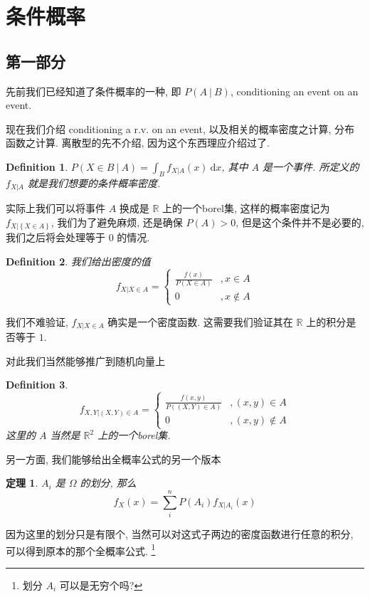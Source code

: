 \documentclass[a4paper, 10pt]{ctexart} %
\newtheorem{theorem}{定理}
\newtheorem{definition}{Definition}
\begin{document}
\section{条件概率}
\subsection{第一部分}
先前我们已经知道了条件概率的一种, 即 $P\left(A\ | \ B\right)$, conditioning an event on an event.

现在我们介绍 conditioning a r.v. on an event, 以及相关的概率密度之计算, 分布函数之计算. 离散型的先不介绍, 因为这个东西理应介绍过了. 
\begin{definition}
    $\displaystyle P\left(X \in B \ | \ A\right) = \int  _{B} f _{X  |  A } \left(x\right) \ \mathrm{d}x$, 其中 $A$ 是一个事件. 所定义的 $f _{X  |  A}$ 就是我们想要的条件概率密度.
\end{definition}
实际上我们可以将事件 $A$ 换成是 $\mathbb{R}$ 上的一个borel集, 这样的概率密度记为 $f _{X| \left\{X \in A\right\}}$, 我们为了避免麻烦, 还是确保 $P \left(A\right) > 0$, 但是这个条件并不是必要的, 我们之后将会处理等于 $0$ 的情况. 

\begin{definition}
    我们给出密度的值
    \[
    f _{X | X \in A} = 
    \begin{cases}
        \frac{f \left(x\right)}{P\left(X \in A\right)}& , x \in A\\ 
        0& , x \notin A
    \end{cases}
    \]
\end{definition}
我们不难验证, $f _{X | X \in A}$ 确实是一个密度函数. 这需要我们验证其在 $\mathbb{R}$ 上的积分是否等于 $1$.

对此我们当然能够推广到随机向量上
\begin{definition}
    \[
    f _{X , Y | (X, Y  ) \in A} = 
    \begin{cases}
        \frac{f \left(x, y\right) }{ P\left( \left(X , Y\right) \in A   \right)} & , \left(x, y\right) \in A \\ 
        0 & , \left(x, y\right) \notin A 
    \end{cases} 
    \] 
    这里的 $A$ 当然是 $\mathbb{R} ^{2}$ 上的一个borel集.
\end{definition}
另一方面, 我们能够给出全概率公式的另一个版本
\begin{theorem}
    $A _{i}$ 是 $\Omega$ 的划分, 那么
    \[
    f _{X} \left(x\right) = \sum_{  i} ^{n} P\left(A _{i}\right) f_{X | A_i} \left(x\right) 
    \]
\end{theorem}
因为这里的划分只是有限个, 当然可以对这式子两边的密度函数进行任意的积分, 可以得到原本的那个全概率公式. \footnote{划分 $A_i$ 可以是无穷个吗?}
\end{document}
